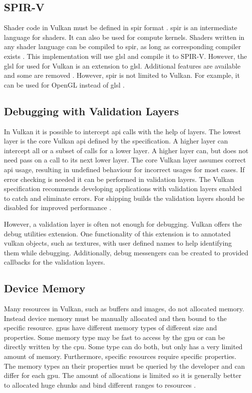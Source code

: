 \subsection{SPIR-V}

Shader code in Vulkan must be defined in \gls{spir} format \cite{khronos:vulkan:spec1.1}. \Gls{spir} is an intermediate language for shaders. It can also be used for compute kernels.  Shaders written in any shader language can be compiled to \gls{spir}, as long as corresponding compiler exists \cite{kessenich:2018:spir}. This implementation will use \gls{glsl} and compile it to SPIR-V. However, the \gls{glsl} for used for Vulkan is an extension to \gls{glsl}. Additional features are available and some are removed \cite{khronos:vulkan:glsl}. However, \gls{spir} is not limited to Vulkan. For example, it can be used for OpenGL instead of \gls{glsl} \cite{khronos:glsl4.60:spec}.

\subsection{Debugging with Validation Layers}

In Vulkan it is possible to intercept \gls{api} calls with the help of layers. The lowest layer is the core Vulkan \gls{api} defined by the specification. A higher layer can intercept all or a subset of calls for a lower layer. A higher layer can, but does not need pass on a call to its next lower layer. The core Vulkan layer assumes correct \gls{api} usage, resulting in undefined behaviour for incorrect usages for most cases. If error checking is needed it can be performed in validation layers. The Vulkan specification recommends developing applications with validation layers enabled to catch and eliminate errors. For shipping builds the validation layers should be disabled for improved performance \cite{khronos:vulkan:spec1.1}.


However, a validation layer is often not enough for debugging. Vulkan offers the debug utilities extension. One functionality of this extension is to annotated vulkan objects, such as textures, with user defined names to help identifying them while debugging. Additionally, debug  messengers can be created to provided callbacks for the validation layers.
\cite{khronos:vulkan:spec1.1}

\subsection{Device Memory}
Many resources in Vulkan, such as buffers and images, do not allocated memory. Instead device memory must be manually allocated and then bound to the specific resource. \Glspl{gpu} have different memory types of different size and properties. Some memory type may be fast to access by the \gls{gpu} or can be directly written by the \gls{cpu}. Some type can do both, but only has a very limited amount of memory. Furthermore, specific resources require specific properties. The memory types an their properties must be queried by the developer and can differ for each \gls{gpu}. The amount of allocations is limited so it is generally better to allocated huge chunks and bind different ranges to resources \cite{khronos:vulkan:spec1.1}.

